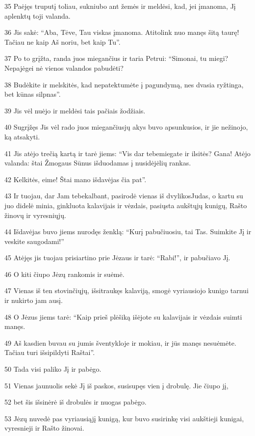 \par 35 Paėjęs truputį toliau, sukniubo ant žemės ir meldėsi, kad, jei įmanoma, Jį aplenktų toji valanda. 
\par 36 Jis sakė: “Aba, Tėve, Tau viskas įmanoma. Atitolink nuo manęs šitą taurę! Tačiau ne kaip Aš noriu, bet kaip Tu”. 
\par 37 Po to grįžta, randa juos miegančius ir taria Petrui: “Simonai, tu miegi? Nepajėgei nė vienos valandos pabudėti? 
\par 38 Budėkite ir melskitės, kad nepatektumėte į pagundymą, nes dvasia ryžtinga, bet kūnas silpnas”. 
\par 39 Jis vėl nuėjo ir meldėsi tais pačiais žodžiais. 
\par 40 Sugrįžęs Jis vėl rado juos miegančius­jų akys buvo apsunkusios, ir jie nežinojo, ką atsakyti. 
\par 41 Jis atėjo trečią kartą ir tarė jiems: “Vis dar tebemiegate ir ilsitės? Gana! Atėjo valanda: štai Žmogaus Sūnus išduodamas į nusidėjėlių rankas. 
\par 42 Kelkitės, eime! Štai mano išdavėjas čia pat”. 
\par 43 Ir tuojau, dar Jam tebekalbant, pasirodė vienas iš dvylikos­Judas, o kartu su juo didelė minia, ginkluota kalavijais ir vėzdais, pasiųsta aukštųjų kunigų, Rašto žinovų ir vyresniųjų. 
\par 44 Išdavėjas buvo jiems nurodęs ženklą: “Kurį pabučiuosiu, tai Tas. Suimkite Jį ir veskite saugodami!” 
\par 45 Atėjęs jis tuojau prisiartino prie Jėzaus ir tarė: “Rabi!”, ir pabučiavo Jį. 
\par 46 O kiti čiupo Jėzų rankomis ir suėmė. 
\par 47 Vienas iš ten stovinčiųjų, išsitraukęs kalaviją, smogė vyriausiojo kunigo tarnui ir nukirto jam ausį. 
\par 48 O Jėzus jiems tarė: “Kaip prieš plėšiką išėjote su kalavijais ir vėzdais suimti manęs. 
\par 49 Aš kasdien buvau su jumis šventykloje ir mokiau, ir jūs manęs nesuėmėte. Tačiau turi išsipildyti Raštai”. 
\par 50 Tada visi paliko Jį ir pabėgo. 
\par 51 Vienas jaunuolis sekė Jį iš paskos, susisupęs vien į drobulę. Jie čiupo jį, 
\par 52 bet šis išsinėrė iš drobulės ir nuogas pabėgo. 
\par 53 Jėzų nuvedė pas vyriausiąjį kunigą, kur buvo susirinkę visi aukštieji kunigai, vyresnieji ir Rašto žinovai. 
